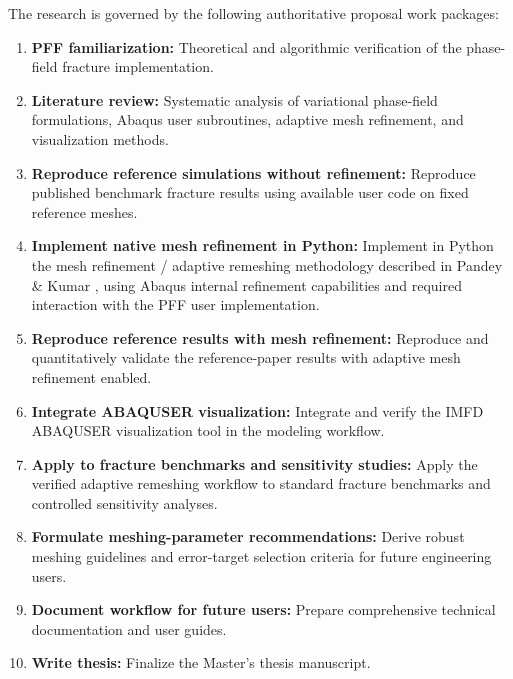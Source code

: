 The research is governed by the following authoritative proposal work packages:
\begin{enumerate}[label=\textbf{Task \arabic*:},leftmargin=18mm]
  \item \textbf{PFF familiarization:} Theoretical and algorithmic verification of the phase-field fracture implementation.
  \item \textbf{Literature review:} Systematic analysis of variational phase-field formulations, Abaqus user subroutines, adaptive mesh refinement, and visualization methods.
  \item \textbf{Reproduce reference simulations without refinement:} Reproduce published benchmark fracture results using available user code on fixed reference meshes.
  \item \textbf{Implement native mesh refinement in Python:} Implement in Python the mesh refinement / adaptive remeshing methodology described in Pandey \& Kumar \citep{Pandey2025}, using Abaqus internal refinement capabilities and required interaction with the PFF user implementation.
  \item \textbf{Reproduce reference results with mesh refinement:} Reproduce and quantitatively validate the reference-paper results with adaptive mesh refinement enabled.
  \item \textbf{Integrate ABAQUSER visualization:} Integrate and verify the IMFD ABAQUSER visualization tool \citep{Roth2014} in the modeling workflow.
  \item \textbf{Apply to fracture benchmarks and sensitivity studies:} Apply the verified adaptive remeshing workflow to standard fracture benchmarks and controlled sensitivity analyses.
  \item \textbf{Formulate meshing-parameter recommendations:} Derive robust meshing guidelines and error-target selection criteria for future engineering users.
  \item \textbf{Document workflow for future users:} Prepare comprehensive technical documentation and user guides.
  \item \textbf{Write thesis:} Finalize the Master's thesis manuscript.
\end{enumerate}

